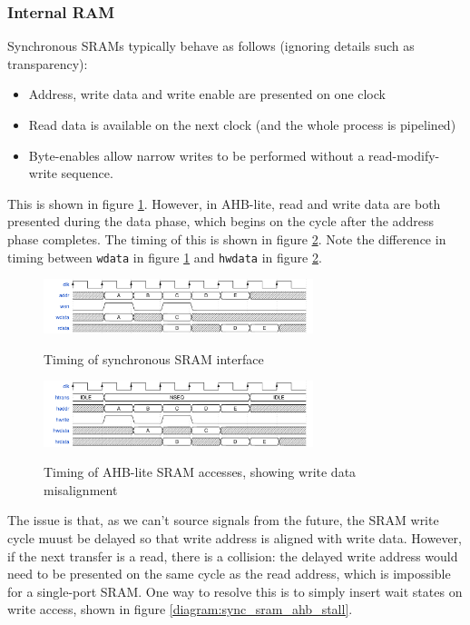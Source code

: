 \subsubsection{Internal RAM}

Synchronous SRAMs typically behave as follows (ignoring details such as transparency):

\begin{itemize}
	\item Address, write data and write enable are presented on one clock
	\item Read data is available on the next clock (and the whole process is pipelined)
	\item Byte-enables allow narrow writes to be performed without a read-modify-write sequence.
\end{itemize}

This is shown in figure \ref{diagram:sync_sram_only}. However, in AHB-lite, read and write data are both presented during the data phase, which begins on the cycle after the address phase completes. The timing of this is shown in figure \ref{diagram:sync_sram_ahb_access}. Note the difference in timing between {\tt wdata} in figure \ref{diagram:sync_sram_only} and {\tt hwdata} in figure \ref{diagram:sync_sram_ahb_access}.


\begin{figure}[H]
\centering
\caption{Timing of synchronous SRAM interface}
\includegraphics[width=0.7\textwidth]{waves/sync_sram_only.pdf}
\label{diagram:sync_sram_only}
\end{figure}


\begin{figure}[H]
\centering
\caption{Timing of AHB-lite SRAM accesses, showing write data misalignment}
\includegraphics[width=0.7\textwidth]{waves/sync_sram_ahb_access.pdf}
\label{diagram:sync_sram_ahb_access}
\end{figure}

The issue is that, as we can't source signals from the future, the SRAM write cycle muust be delayed so that write address is aligned with write data. However, if the next transfer is a read, there is a collision: the delayed write address would need to be presented on the same cycle as the read address, which is impossible for a single-port SRAM. One way to resolve this is to simply insert wait states on write access, shown in figure \ref{diagram:sync_sram_ahb_stall}.


